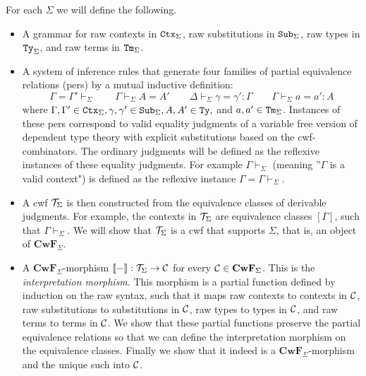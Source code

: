 \documentclass{lmcs}
\def\Cwf{\mathbf{CwF}}
\begin{document}
For each $\Sigma$ we will define the following.
\begin{itemize}
\item 
A grammar for raw contexts in ${\tt Ctx}_\Sigma$, raw substitutions in ${\tt Sub}_\Sigma$, raw types in ${\tt Ty}_\Sigma$, and raw terms in ${\tt Tm}_\Sigma$. 
\item
A system of inference rules that generate four families of partial equivalence relations (pers) by a mutual inductive definition:
$$
\Gamma = \Gamma' \vdash_\Sigma
\qquad
\Gamma \vdash_\Sigma A = A' 
\qquad
\Delta \vdash_\Sigma \gamma = \gamma' : \Gamma
\qquad
\Gamma \vdash_\Sigma a = a' : A
$$
where $\Gamma, \Gamma' \in {\tt Ctx}_\Sigma, \gamma, \gamma' \in {\tt Sub}_\Sigma, A, A' \in {\tt Ty},$ and $a,a' \in {\tt Tm}_\Sigma$. Instances of these pers correspond to valid equality judgments of a variable free version of dependent type theory with explicit substitutions based on the cwf-combinators. The ordinary judgments will be defined as the reflexive instances of these equality judgments. For example $\Gamma \vdash_\Sigma$ (meaning ”$\Gamma$ is a valid context") is defined as the reflexive instance $\Gamma = \Gamma \vdash_\Sigma$.
\item
A cwf ${\mathcal T}_\Sigma$ is then constructed from the equivalence classes of derivable judgments. For example, the contexts in ${\mathcal T}_\Sigma$ are equivalence classes $[\Gamma]$, such that $\Gamma \vdash_\Sigma$. We will show that ${\mathcal T}_\Sigma$ is a cwf that supports $\Sigma$, that is, an object of $\Cwf_\Sigma$.
\item
A $\Cwf_\Sigma$-morphism $\llbracket - \rrbracket : {\mathcal T}_\Sigma \to {\mathcal C}$ for every $\C \in \Cwf_\Sigma$. This is the {\em interpretation morphism}. This morphism is a partial function defined by induction on the raw syntax, such that it maps raw contexts to contexts in ${\mathcal C}$, raw substitutions to substitutions in ${\mathcal C}$, raw types to types in ${\mathcal C}$, and raw terms to terms in ${\mathcal C}$. We show that these partial functions preserve the partial equivalence relations so that we can define the interpretation morphism on the equivalence classes. Finally we show that it indeed is a $\Cwf_\Sigma$-morphism and the unique such into ${\mathcal C}$.
\end{itemize}
 
\end{document}

